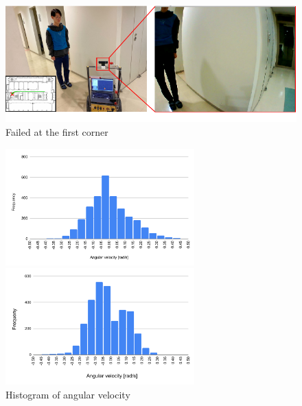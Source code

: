 \newpage

  \begin{figure}[h]
    \centering
    \includegraphics[keepaspectratio, scale=0.80] {images/pdf/RobotGuidance_failed_place}
    \captionsetup{justification=raggedright} %
    \caption{Failed at the first corner}
    \label{Fig:RobotGuidance_failed_place}
  \end{figure}

  \begin{figure}[h]
    \centering
    \begin{minipage}[c]{65mm} 
        \centering
        \includegraphics[height=45mm]{images/pdf/RobotGuidance_success_histogram}
    \end{minipage}
    \begin{minipage}[c]{65mm} 
        \centering
        \includegraphics[height=45mm]{images/pdf/RobotGuidance_failed_histogram}
    \end{minipage}
    \caption{Histogram of angular velocity}
    \label{Fig:Histogram of angular velocity}
  \end{figure}

\newpage
